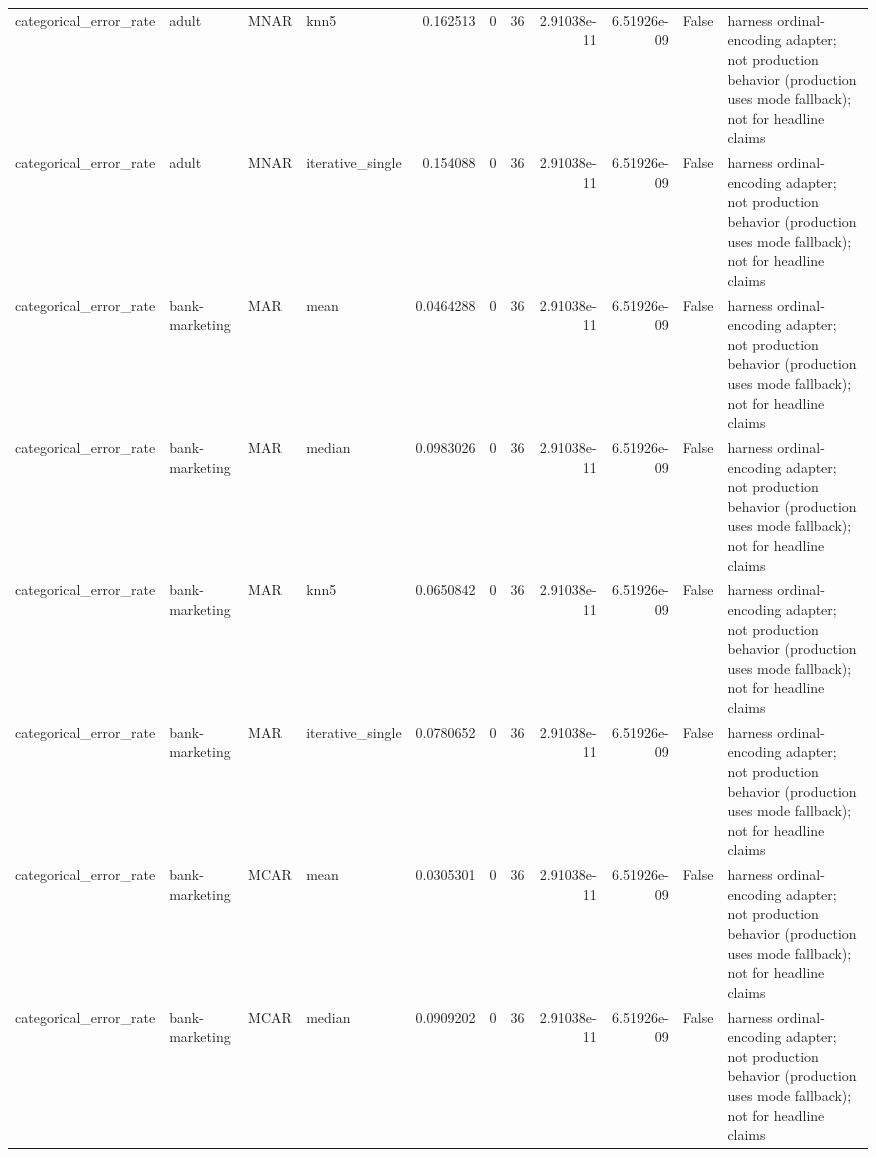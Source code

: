 \begin{table}[ht]
\begin{tabular}{llllrrrrrll}
 categorical\_error\_rate & adult                & MNAR        & knn5             &      0.162513    &                   0 &      36 & 2.91038e-11 & 6.51926e-09 & False              & harness ordinal-encoding adapter; not production behavior (production uses mode fallback); not for headline claims \\
 categorical\_error\_rate & adult                & MNAR        & iterative\_single &      0.154088    &                   0 &      36 & 2.91038e-11 & 6.51926e-09 & False              & harness ordinal-encoding adapter; not production behavior (production uses mode fallback); not for headline claims \\
 categorical\_error\_rate & bank-marketing       & MAR         & mean             &      0.0464288   &                   0 &      36 & 2.91038e-11 & 6.51926e-09 & False              & harness ordinal-encoding adapter; not production behavior (production uses mode fallback); not for headline claims \\
 categorical\_error\_rate & bank-marketing       & MAR         & median           &      0.0983026   &                   0 &      36 & 2.91038e-11 & 6.51926e-09 & False              & harness ordinal-encoding adapter; not production behavior (production uses mode fallback); not for headline claims \\
 categorical\_error\_rate & bank-marketing       & MAR         & knn5             &      0.0650842   &                   0 &      36 & 2.91038e-11 & 6.51926e-09 & False              & harness ordinal-encoding adapter; not production behavior (production uses mode fallback); not for headline claims \\
 categorical\_error\_rate & bank-marketing       & MAR         & iterative\_single &      0.0780652   &                   0 &      36 & 2.91038e-11 & 6.51926e-09 & False              & harness ordinal-encoding adapter; not production behavior (production uses mode fallback); not for headline claims \\
 categorical\_error\_rate & bank-marketing       & MCAR        & mean             &      0.0305301   &                   0 &      36 & 2.91038e-11 & 6.51926e-09 & False              & harness ordinal-encoding adapter; not production behavior (production uses mode fallback); not for headline claims \\
 categorical\_error\_rate & bank-marketing       & MCAR        & median           &      0.0909202   &                   0 &      36 & 2.91038e-11 & 6.51926e-09 & False              & harness ordinal-encoding adapter; not production behavior (production uses mode fallback); not for headline claims \\

\end{tabular}
\end{table}
